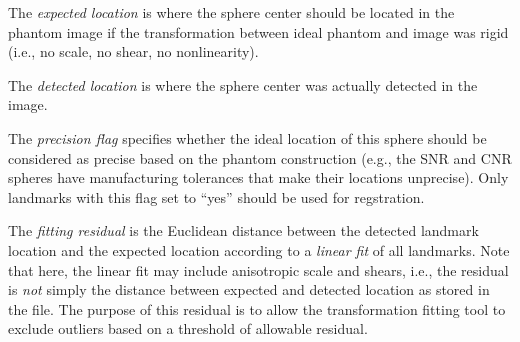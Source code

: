 \documentclass{InsightArticle}
\begin{document}
The {\em expected location\/} is where the sphere center should be located in
the phantom image if the transformation between ideal phantom and image was
rigid (i.e., no scale, no shear, no nonlinearity). 

The {\em detected location\/} is where the sphere center was actually detected
in the image.

The {\em precision flag\/} specifies whether the ideal location of this sphere
should be considered as precise based on the phantom construction (e.g., the
SNR and CNR spheres have manufacturing tolerances that make their locations
unprecise). Only landmarks with this flag set to ``yes'' should be used for
regstration.

The {\em fitting residual\/} is the Euclidean distance between the detected
landmark location and the expected location according to a {\em linear fit\/}
of all landmarks. Note that here, the linear fit may include anisotropic scale
and shears, i.e., the residual is {\em not\/} simply the distance between
expected and detected location as stored in the file. The purpose of this
residual is to allow the transformation fitting tool to exclude outliers based
on a threshold of allowable residual.
\end{document}
